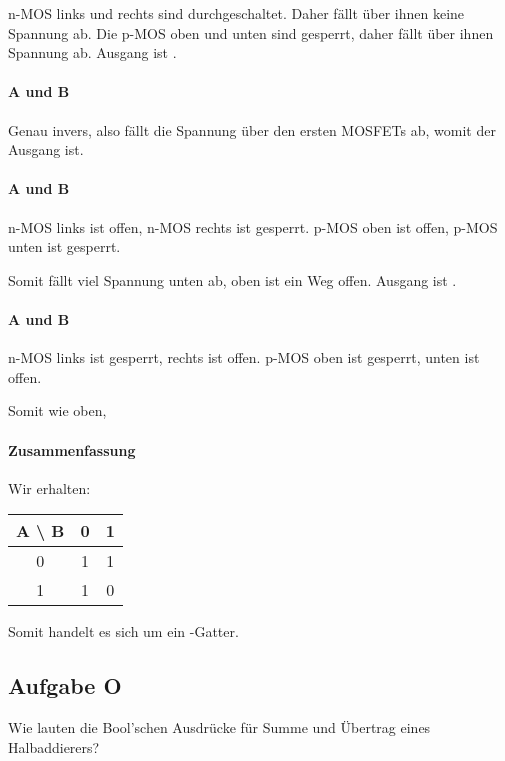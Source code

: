 n-MOS links und rechts sind durchgeschaltet. Daher fällt über ihnen keine
Spannung ab. Die p-MOS oben und unten sind gesperrt, daher fällt über ihnen
Spannung ab. Ausgang ist \thigh.

\paragraph{A und B \thigh}

Genau invers, also fällt die Spannung über den ersten MOSFETs ab, womit der
Ausgang \tlow ist.

\paragraph{A \thigh{} und B \tlow}

n-MOS links ist offen, n-MOS rechts ist gesperrt. p-MOS oben ist offen, p-MOS
unten ist gesperrt.

Somit fällt viel Spannung unten ab, oben ist ein Weg offen. Ausgang ist \thigh.

\paragraph{A \tlow{} und B \thigh}

n-MOS links ist gesperrt, rechts ist offen. p-MOS oben ist gesperrt, unten ist
offen.

Somit wie oben, \thigh

\paragraph{Zusammenfassung}

Wir erhalten:

\begin{tabular}{c|cc}
	A \textbackslash{} B & 0 & 1 \\
	\hline
	0 & 1 & 1 \\
	1 & 1 & 0
\end{tabular}

Somit handelt es sich um ein \tnand-Gatter.

\FloatBarrier
\subsection{Aufgabe O}

\begin{problem}
	Wie lauten die Bool'schen Ausdrücke für Summe und Übertrag eines
	Halbaddierers?
\end{problem}

